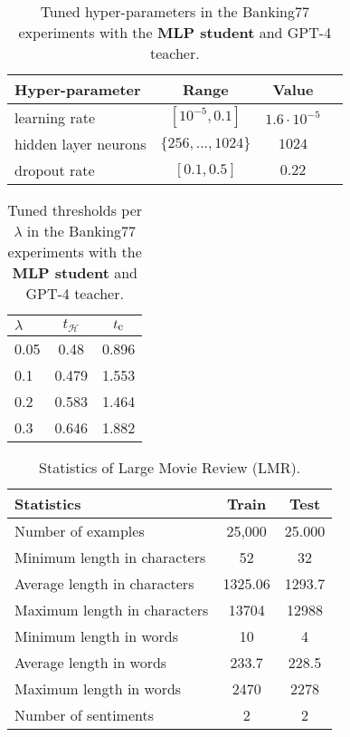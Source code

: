 \documentclass[11pt]{article}
\begin{document}
\begin{table}[h]
\centering
{\small
  \begin{tabular}{|l|c|c|c|}
    \hline
    \textbf{Hyper-parameter} & \textbf{Range} & \textbf{Value} \\
    \hline
    learning rate & $[10^{-5},0.1]$ & $1.6\cdot10^{-5}$ \\
    hidden layer neurons & $\{256, ..., 1024\}$ & $1024$ \\
    dropout rate & $[0.1, 0.5]$ & $0.22$ \\
    \hline
  \end{tabular}
  }
\vspace{-1mm}
\caption{Tuned hyper-parameters in the Banking77 experiments with the \textbf{MLP student} and GPT-4 teacher.}
\label{tab:params}
\end{table}

\begin{table}[!h]
\centering
\small
    \begin{tabular}{|l|c|c|}
    \hline
    \textbf{$\lambda$} & \textbf{$t_\mathcal{H}$} & $t_{\textrm{\small c}}$ \\
    \hline
        0.05 & 0.48 & 0.896\\
        0.1 & 0.479 & 1.553 \\
        0.2 & 0.583 & 1.464 \\
        0.3 & 0.646 & 1.882 \\
    \hline
    \end{tabular}
    \vspace{-1mm}
\caption{Tuned thresholds per \(\lambda\) in the Banking77 experiments with the \textbf{MLP student} and GPT-4 teacher.}
\label{tab:threshold_pel_l_mlp}
\vspace{-1em}
\end{table}


\begin{table}[tb]
\centering
\small

    \begin{tabular}{|l|c|c|}
    \hline
    \textbf{Statistics} & \textbf{Train} & \textbf{Test} \\
    \hline
        Number of examples & 25,000 & 25.000 \\
        \hline
        Minimum length in characters & 52 & 32 \\
        Average length in characters & 1325.06 & 1293.7 \\
        Maximum length in characters & 13704 & 12988 \\
        \hline
        Minimum length in words & 10 & 4 \\
        Average length in words & 233.7 & 228.5 \\
        Maximum length in words & 2470 & 2278 \\
        \hline
        Number of sentiments & 2 & 2 \\
    \hline
    \end{tabular}
    \vspace{-1mm}
\caption{Statistics of Large Movie Review (LMR).}
\label{tab:lmr-stats}
\vspace{-1em}
\end{table}
\end{document}
